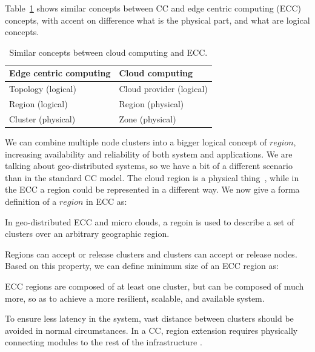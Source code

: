 Table~\ref{tab:table5} shows similar concepts between CC and edge centric computing (ECC) concepts, with accent on difference what is the physical part, and what are logical concepts.

\begin{table}[h!]
	\begin{center}
		\begin{tabular}{l|l}
			\textbf{Edge centric computing} & \textbf{Cloud computing}\\
			\hline
			Topology (logical) & Cloud provider (logical)\\
			Region (logical) & Region (physical)\\
			Cluster (physical) & Zone (physical)\\
		\end{tabular}
	\end{center}
	\vspace{-0.5cm}
	\caption{Similar concepts between cloud computing and ECC.}
	\label{tab:table5}
\end{table}

We can combine multiple node clusters into a bigger logical concept of $region$, increasing availability and reliability of both system and applications. We are talking about geo-distributed systems, so we have a bit of a different scenario than in the standard CC model. The cloud region is a physical thing~\cite{SouzaMFAK19}, while in the ECC a region could be represented in a different way. We now give a forma definition of a $region$ in ECC as:

\begin{definition}
	In geo-distributed ECC and micro clouds, a regoin is used to describe a set of clusters over an arbitrary geographic region. 
\end{definition}

Regions can accept or release clusters and clusters can accept or release nodes. Based on this property, we can define minimum size of an ECC region as:

\begin{definition}
	ECC regions are composed of at least one cluster, but can be composed of much more, so as to achieve a more resilient, scalable, and available system. 
\end{definition}

To ensure less latency in the system, vast distance between clusters should be avoided in normal circumstances. In a CC, region extension requires physically connecting modules to the rest of the infrastructure \cite{Hamilton07}.\\ 

